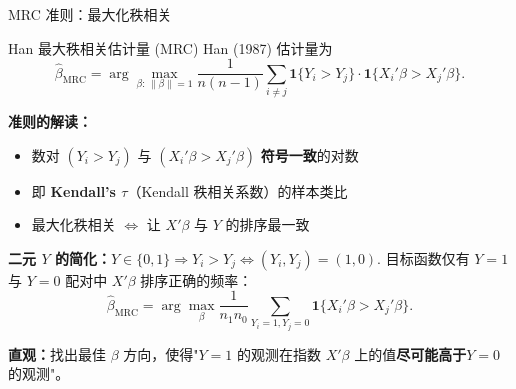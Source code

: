 \documentclass[aspectratio=169, 10pt]{beamer}
\begin{document}
\begin{frame}[shrink=10]{MRC 准则：最大化秩相关}

  \begin{definitionbox}{{Han 最大秩相关估计量 (MRC)}}
    Han (1987) 估计量为
    $$\hat\beta_{\text{MRC}} = \arg\max_{\beta:\, \|\beta\|=1}
    \frac{1}{n(n-1)}\sum_{i \neq j}
    \mathbf{1}\{Y_i > Y_j\} \cdot \mathbf{1}\{X_i'\beta > X_j'\beta\}.$$
  \end{definitionbox}

  \begin{highlightbox}
    \textbf{准则的解读：}
    \begin{itemize}\setlength{\itemsep}{1pt}
      \item 数对 $(Y_i > Y_j)$ 与 $(X_i'\beta > X_j'\beta)$ \textbf{符号一致}的对数
      \item 即 \textbf{Kendall's $\tau$}（Kendall 秩相关系数）的样本类比
      \item 最大化秩相关 $\Leftrightarrow$ 让 $X'\beta$ 与 $Y$ 的排序最一致
    \end{itemize}
  \end{highlightbox}

  \textbf{二元 $Y$ 的简化：}$Y \in \{0, 1\} \Rightarrow Y_i > Y_j \Leftrightarrow (Y_i, Y_j) = (1, 0)$.
  目标函数仅有 $Y = 1$ 与 $Y = 0$ 配对中 $X'\beta$ 排序正确的频率：
  $$\hat\beta_{\text{MRC}} = \arg\max_{\beta} \frac{1}{n_1 n_0}
  \sum_{Y_i=1, Y_j=0} \mathbf{1}\{X_i'\beta > X_j'\beta\}.$$

  \begin{keybox}
    \textbf{直观：}找出最佳 $\beta$ 方向，使得"$Y=1$ 的观测在指数 $X'\beta$ 上的值\textbf{尽可能高于}$Y=0$ 的观测"。
  \end{keybox}

\end{frame}
\end{document}

